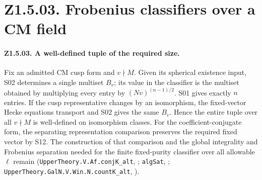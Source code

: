 \section*{Z1.5.03. Frobenius classifiers over a CM field}

\paragraph{Z1.5.03. A well-defined tuple of the required size.}
\label{r8:small:Z1.5.03}
Fix an admitted CM cusp form and \(v\nmid M\). Given its spherical
existence input, S02 determines a single multiset \(B_v\); its value in
the classifier is the multiset obtained by multiplying every entry
by \( (Nv)^{(n-1)/2}\). S01 gives exactly \(n\) entries. If the cusp
representative changes by an isomorphism, the fixed-vector Hecke equations
transport and S02 gives the same \(B_v\). Hence the entire tuple over
all \(v\nmid M\) is well-defined on isomorphism classes. For the
coefficient-conjugate form, the separating representation comparison
preserves the required fixed vector by S12. The construction of that
comparison and the global integrality and Frobenius separation needed
for the finite fixed-purity classifier over all allowable \(\ell\) remain
(\nolinkurl{UpperTheory.V.Af.conjK_alt}, ;
\nolinkurl{algSat}, ;
\nolinkurl{UpperTheory.GalN.V.Win.N.countK_alt},
).

